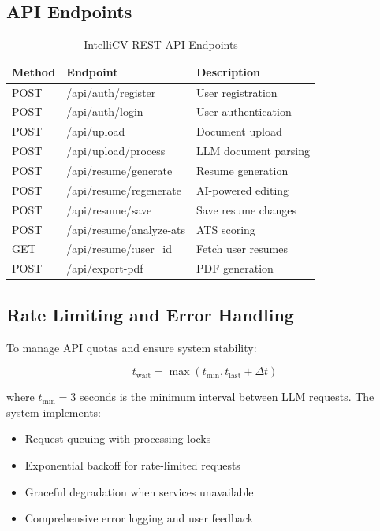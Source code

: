 \documentclass[conference]{IEEEtran}
\begin{document}
\subsection{API Endpoints}

\begin{table}[h]
\centering
\caption{IntelliCV REST API Endpoints}
\label{tab:api}
\begin{tabular}{@{}llp{3cm}@{}}
\toprule
\textbf{Method} & \textbf{Endpoint} & \textbf{Description} \\
\midrule
POST & /api/auth/register & User registration \\
POST & /api/auth/login & User authentication \\
POST & /api/upload & Document upload \\
POST & /api/upload/process & LLM document parsing \\
POST & /api/resume/generate & Resume generation \\
POST & /api/resume/regenerate & AI-powered editing \\
POST & /api/resume/save & Save resume changes \\
POST & /api/resume/analyze-ats & ATS scoring \\
GET & /api/resume/:user\_id & Fetch user resumes \\
POST & /api/export-pdf & PDF generation \\
\bottomrule
\end{tabular}
\end{table}

\subsection{Rate Limiting and Error Handling}

To manage API quotas and ensure system stability:

\begin{equation}
t_{\text{wait}} = \max(t_{\text{min}}, t_{\text{last}} + \Delta t)
\label{eq:throttle}
\end{equation}

where $t_{\text{min}} = 3$ seconds is the minimum interval between LLM requests. The system implements:

\begin{itemize}
    \item Request queuing with processing locks
    \item Exponential backoff for rate-limited requests
    \item Graceful degradation when services unavailable
    \item Comprehensive error logging and user feedback
\end{itemize}
\end{document}
